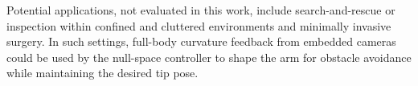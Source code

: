Potential applications, not evaluated in this work, include search-and-rescue or inspection within confined and cluttered environments and minimally invasive surgery. In such settings, full-body curvature feedback from embedded cameras could be used by the null-space controller to shape the arm for obstacle avoidance while maintaining the desired tip pose.

